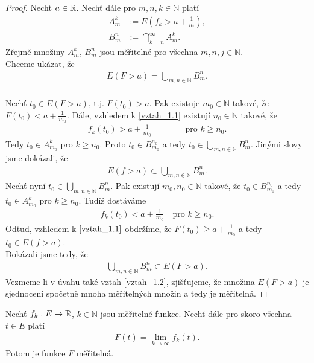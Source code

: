 \begin{proof}
Nechť $a \in \mathbb{R}$. Nechť dále pro $m,n,k \in \mathbb{N}$ platí
\begin{align*}
A_m^k&:= E(f_k > a+\frac{1}{m}), \\
B_m^n &:= \bigcap \limits _{k=n}^{\infty}A_m^k.
\end{align*}
Zřejmě množiny $A_m^k$, $B_m^n$ jsou měřitelné pro všechna $m,n,j \in \mathbb{N}$. \\
Chceme ukázat, že 
\begin{align}
E(F>a)= \bigcup \limits _{m,n \in \mathbb{N}} B_m^n.
\label{vztah_1.2}
\end{align} \\
Nechť $t_0 \in E(F>a)$, t.j. $F(t_0)>a$. Pak existuje $m_0 \in \mathbb{N}$ takové, že $F(t_0)<a+\frac{1}{m_0}$. Dále, vzhledem k \eqref{vztah_1.1} existují $n_0 \in \mathbb{N}$ takové, že
\begin{align*}
f_k(t_0)>a+\frac{1}{m_0} \qquad \qquad \text{pro $k \geq n_0$.}
\end{align*}
Tedy $t_0 \in A_{m_0}^k$ pro $k \geq n_0$. Proto $t_0 \in B_{m_0}^{n_0}$ a tedy $t_0 \in \bigcup \limits _{m,n \in \mathbb{N}}B_{m}^n $. Jinými slovy jsme dokázali, že 
\begin{align}
E(f>a) \subset \bigcup_{m,n \in \mathbb{N}} B_m^n.
\label{vztah_1.3}
\end{align}
Nechť nyní $t_0 \in \bigcup \limits _{m,n \in \mathbb{N}} B_m^n$. Pak existují $m_0, n_0 \in \mathbb{N}$ takové, že $t_0 \in B_{m_0}^{n_0}$ a tedy $t_0 \in A_{m_0}^k$ pro $k \geq n_0$. Tudíž dostáváme
\begin{align*}
f_k(t_0) < a+ \frac{1}{m_0} \quad \text{pro $k \geq n_0$.}
\end{align*}
Odtud, vzhledem k $\eqref{vztah_1.1}$ obdržíme, že $F(t_0) \geq a+ \frac{1}{m_0}$ a tedy $t_0 \in E(f>a)$. \\
Dokázali jsme tedy, že 
\begin{align*}
\bigcup \limits _{m,n \in \mathbb{N}} B_m^n \subset E(F>a).
\end{align*}
Vezmeme-li v úvahu také vztah \eqref{vztah_1.2}, zjišťujeme, že množina $E(F>a)$ je sjednocení spočetně mnoha měřitelných množin a tedy je měřitelná. 
\end{proof}

\begin{theorem}
Nechť $f_k:E \to \mathbb{R}$, $k \in \mathbb{N}$ jsou měřitelné funkce. Nechť dále pro skoro všechna $t \in E$ platí
\begin{align*}
F(t)=\lim \limits _{k \to \infty} f_k(t).
\end{align*}
Potom je funkce $F$ měřitelná.
\end{theorem}

